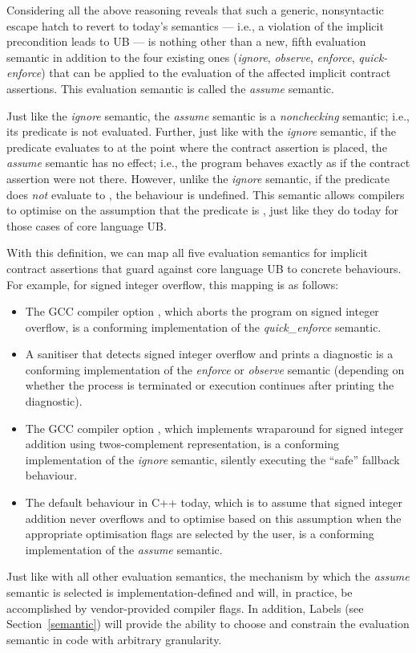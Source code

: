 Considering all the above reasoning reveals that such a generic, nonsyntactic escape hatch to revert to today's semantics --- i.e., a violation of the implicit precondition leads to UB --- is nothing other than a new, fifth evaluation semantic in addition to the four existing ones (\emph{ignore}, \emph{observe}, \emph{enforce}, \emph{quick-enforce}) that can be applied to the evaluation of the affected implicit contract assertions. This evaluation semantic is called the \emph{assume} semantic.

Just like the \emph{ignore} semantic, the \emph{assume} semantic is a \emph{nonchecking} semantic; i.e., its predicate is not evaluated. Further, just like with the \emph{ignore} semantic, if the predicate evaluates to  at the point where the contract assertion is placed, the \emph{assume} semantic has no effect; i.e., the program behaves exactly as if the contract assertion were not there. However, unlike the \emph{ignore} semantic, if the predicate does \emph{not} evaluate to , the behaviour is undefined. This semantic allows compilers to optimise on the assumption that the predicate is , just like they do today for those cases of core language UB.

With this definition, we can map all five evaluation semantics for implicit contract assertions that guard against core language UB to concrete behaviours. For example, for signed integer overflow, this mapping is as follows:
\begin{itemize}
\item The GCC compiler option , which aborts the program on signed integer overflow, is a conforming implementation of the \emph{quick_enforce} semantic.
\item A sanitiser that detects signed integer overflow and prints a diagnostic is a conforming
implementation of the \emph{enforce} or \emph{observe} semantic (depending on whether the
process is terminated or execution continues after printing the diagnostic).
\item The GCC compiler option , which implements wraparound for signed integer addition using twos-complement representation, is a conforming implementation of the \emph{ignore} semantic,  silently executing the ``safe'' fallback behaviour.
\item The default behaviour in C++ today, which is to assume that signed integer addition never overflows and to optimise based on this assumption when the appropriate optimisation flags are selected by the user, is a conforming implementation of the \emph{assume} semantic.
\end{itemize}
Just like with all other evaluation semantics, the mechanism by which the \emph{assume} semantic is selected is implementation-defined and will, in practice, be accomplished by vendor-provided compiler flags. In addition, Labels (see Section~\ref{semantic}) will provide the ability to choose and constrain the evaluation semantic in code with arbitrary granularity.

